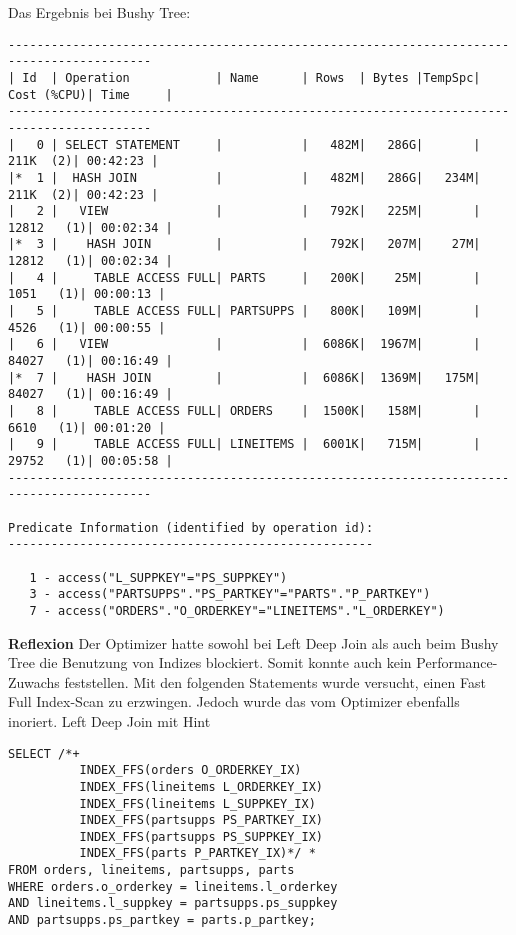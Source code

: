 \documentclass[10pt]{article}
\begin{document}
Das Ergebnis bei Bushy Tree:
\begin{lstlisting}[style=queryexecutionplan]
------------------------------------------------------------------------------------------
| Id  | Operation            | Name      | Rows  | Bytes |TempSpc| Cost (%CPU)| Time     |
------------------------------------------------------------------------------------------
|   0 | SELECT STATEMENT     |           |   482M|   286G|       |   211K  (2)| 00:42:23 |
|*  1 |  HASH JOIN           |           |   482M|   286G|   234M|   211K  (2)| 00:42:23 |
|   2 |   VIEW               |           |   792K|   225M|       | 12812   (1)| 00:02:34 |
|*  3 |    HASH JOIN         |           |   792K|   207M|    27M| 12812   (1)| 00:02:34 |
|   4 |     TABLE ACCESS FULL| PARTS     |   200K|    25M|       |  1051   (1)| 00:00:13 |
|   5 |     TABLE ACCESS FULL| PARTSUPPS |   800K|   109M|       |  4526   (1)| 00:00:55 |
|   6 |   VIEW               |           |  6086K|  1967M|       | 84027   (1)| 00:16:49 |
|*  7 |    HASH JOIN         |           |  6086K|  1369M|   175M| 84027   (1)| 00:16:49 |
|   8 |     TABLE ACCESS FULL| ORDERS    |  1500K|   158M|       |  6610   (1)| 00:01:20 |
|   9 |     TABLE ACCESS FULL| LINEITEMS |  6001K|   715M|       | 29752   (1)| 00:05:58 |
------------------------------------------------------------------------------------------
 
Predicate Information (identified by operation id):
---------------------------------------------------
 
   1 - access("L_SUPPKEY"="PS_SUPPKEY")
   3 - access("PARTSUPPS"."PS_PARTKEY"="PARTS"."P_PARTKEY")
   7 - access("ORDERS"."O_ORDERKEY"="LINEITEMS"."L_ORDERKEY")
\end{lstlisting}
\textbf{Reflexion} \newline
Der Optimizer hatte sowohl bei Left Deep Join als auch beim Bushy Tree die Benutzung von Indizes blockiert.
Somit konnte auch kein Performance-Zuwachs feststellen. \newline
Mit den folgenden Statements wurde versucht, einen Fast Full Index-Scan zu erzwingen. Jedoch wurde das vom Optimizer ebenfalls inoriert.\newline
Left Deep Join mit Hint
\begin{lstlisting}[style=sql]
SELECT /*+ 
          INDEX_FFS(orders O_ORDERKEY_IX) 
          INDEX_FFS(lineitems L_ORDERKEY_IX) 
          INDEX_FFS(lineitems L_SUPPKEY_IX) 
          INDEX_FFS(partsupps PS_PARTKEY_IX) 
          INDEX_FFS(partsupps PS_SUPPKEY_IX) 
          INDEX_FFS(parts P_PARTKEY_IX)*/ *
FROM orders, lineitems, partsupps, parts
WHERE orders.o_orderkey = lineitems.l_orderkey
AND lineitems.l_suppkey = partsupps.ps_suppkey
AND partsupps.ps_partkey = parts.p_partkey;
\end{lstlisting}
\end{document}
